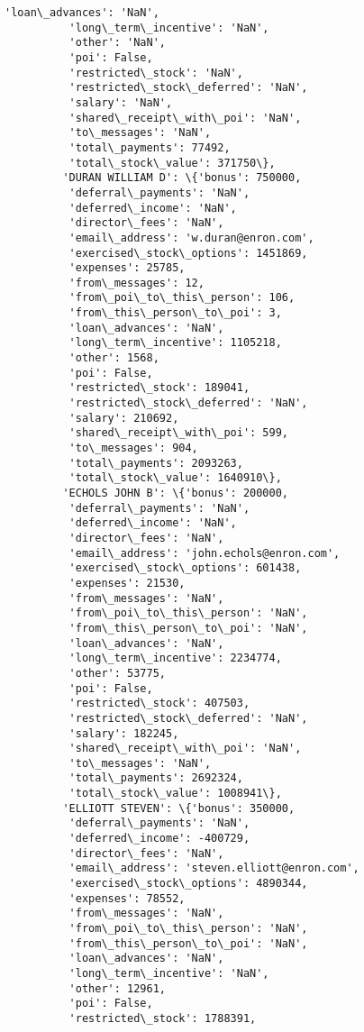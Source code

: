 \documentclass[11pt]{article}
\begin{document}
\begin{Verbatim}[commandchars=\\\{\}]
          'loan\_advances': 'NaN',
          'long\_term\_incentive': 'NaN',
          'other': 'NaN',
          'poi': False,
          'restricted\_stock': 'NaN',
          'restricted\_stock\_deferred': 'NaN',
          'salary': 'NaN',
          'shared\_receipt\_with\_poi': 'NaN',
          'to\_messages': 'NaN',
          'total\_payments': 77492,
          'total\_stock\_value': 371750\},
         'DURAN WILLIAM D': \{'bonus': 750000,
          'deferral\_payments': 'NaN',
          'deferred\_income': 'NaN',
          'director\_fees': 'NaN',
          'email\_address': 'w.duran@enron.com',
          'exercised\_stock\_options': 1451869,
          'expenses': 25785,
          'from\_messages': 12,
          'from\_poi\_to\_this\_person': 106,
          'from\_this\_person\_to\_poi': 3,
          'loan\_advances': 'NaN',
          'long\_term\_incentive': 1105218,
          'other': 1568,
          'poi': False,
          'restricted\_stock': 189041,
          'restricted\_stock\_deferred': 'NaN',
          'salary': 210692,
          'shared\_receipt\_with\_poi': 599,
          'to\_messages': 904,
          'total\_payments': 2093263,
          'total\_stock\_value': 1640910\},
         'ECHOLS JOHN B': \{'bonus': 200000,
          'deferral\_payments': 'NaN',
          'deferred\_income': 'NaN',
          'director\_fees': 'NaN',
          'email\_address': 'john.echols@enron.com',
          'exercised\_stock\_options': 601438,
          'expenses': 21530,
          'from\_messages': 'NaN',
          'from\_poi\_to\_this\_person': 'NaN',
          'from\_this\_person\_to\_poi': 'NaN',
          'loan\_advances': 'NaN',
          'long\_term\_incentive': 2234774,
          'other': 53775,
          'poi': False,
          'restricted\_stock': 407503,
          'restricted\_stock\_deferred': 'NaN',
          'salary': 182245,
          'shared\_receipt\_with\_poi': 'NaN',
          'to\_messages': 'NaN',
          'total\_payments': 2692324,
          'total\_stock\_value': 1008941\},
         'ELLIOTT STEVEN': \{'bonus': 350000,
          'deferral\_payments': 'NaN',
          'deferred\_income': -400729,
          'director\_fees': 'NaN',
          'email\_address': 'steven.elliott@enron.com',
          'exercised\_stock\_options': 4890344,
          'expenses': 78552,
          'from\_messages': 'NaN',
          'from\_poi\_to\_this\_person': 'NaN',
          'from\_this\_person\_to\_poi': 'NaN',
          'loan\_advances': 'NaN',
          'long\_term\_incentive': 'NaN',
          'other': 12961,
          'poi': False,
          'restricted\_stock': 1788391,

\end{Verbatim}
\end{document}
